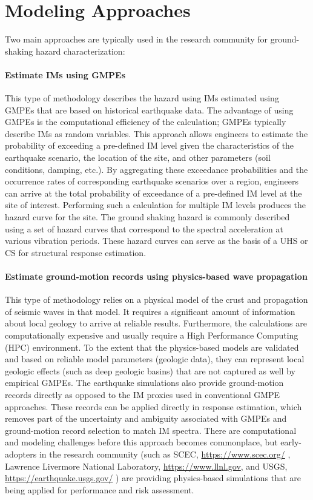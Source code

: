 \section{Modeling Approaches}
\label{sec:eq_shake_models}

Two main approaches are typically used in the research community for ground-shaking hazard characterization:

\paragraph{Estimate IMs using GMPEs} This type of methodology describes the hazard using IMs estimated using GMPEs that are based on historical earthquake data. The advantage of using GMPEs is the computational efficiency of the calculation; GMPEs typically describe IMs as random variables. This approach allows engineers to estimate the probability of exceeding a pre-defined IM level given the characteristics of the earthquake scenario, the location of the site, and other parameters (soil conditions, damping, etc.). By aggregating these exceedance probabilities and the occurrence rates of corresponding earthquake scenarios over a region, engineers can arrive at the total probability of exceedance of a pre-defined IM level at the site of interest. Performing such a calculation for multiple IM levels produces the hazard curve for the site. The ground shaking hazard is commonly described using a set of hazard curves that correspond to the spectral acceleration at various vibration periods. These hazard curves can serve as the basis of a UHS or CS for structural response estimation.

\paragraph{Estimate ground-motion records using physics-based wave propagation} This type of methodology relies on a physical model of the crust and propagation of seismic waves in that model. It requires a significant amount of information about local geology to arrive at reliable results. Furthermore, the calculations are computationally expensive and usually require a High Performance Computing (HPC) environment. To the extent that the physics-based models are validated and based on reliable model parameters (geologic data), they can represent local geologic effects (such as deep geologic basins) that are not captured as well by empirical GMPEs. The earthquake simulations also provide ground-motion records directly as opposed to the IM proxies used in conventional GMPE approaches. These records can be applied directly in response estimation, which removes part of the uncertainty and ambiguity associated with GMPEs and ground-motion record selection to match IM spectra. There are computational and modeling challenges before this approach becomes commonplace, but early-adopters in the research community (such as SCEC, \url{https://www.scec.org/} , Lawrence Livermore National Laboratory, \url{https://www.llnl.gov}, and USGS, \url{https://earthquake.usgs.gov/} ) are providing physics-based simulations that are being applied for performance and risk assessment.

